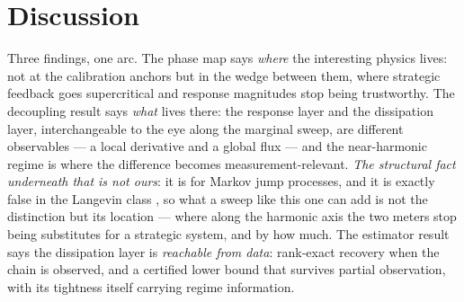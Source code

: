 \section{Discussion}
\label{sec:discussion}

Three findings, one arc. The phase map says \emph{where} the interesting
physics lives: not at the calibration anchors but in the wedge between them,
where strategic feedback goes supercritical and response magnitudes stop
being trustworthy. The decoupling result says \emph{what} lives there: the
response layer and the dissipation layer, interchangeable to the eye along
the marginal sweep, are different observables --- a local derivative and a
global flux --- and the near-harmonic regime is where the difference becomes
measurement-relevant. \emph{The structural fact underneath that is not ours}:
it is \citet{baiesi2009} for Markov jump processes, and it is exactly false in
the Langevin class \citep{haradasasa2005}, so what a sweep like this one can
add is not the distinction but its location --- where along the harmonic axis
the two meters stop being substitutes for a strategic system, and by how much.
The estimator result says the
dissipation layer is \emph{reachable from data}: rank-exact recovery when the
chain is observed, and a certified lower bound that survives partial
observation, with its tightness itself carrying regime information.

